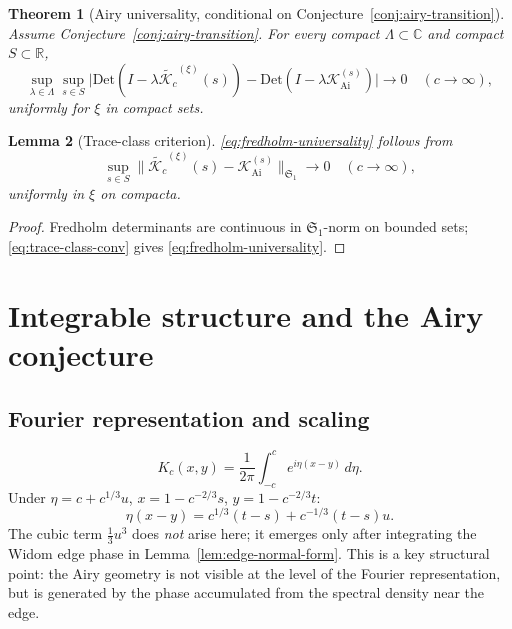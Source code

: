\documentclass[12pt,a4paper]{amsart}
\newtheorem{theorem}{Theorem}[section]
\newtheorem{lemma}[theorem]{Lemma}
\theoremstyle{definition}
\theoremstyle{remark}
\newcommand{\norm}[1]{\|#1\|}
\newcommand{\Kc}{\mathcal{K}_c}
\newcommand{\Kairy}{\mathcal{K}_{\mathrm{Ai}}}
\newcommand{\R}{\mathbb{R}}
\newcommand{\Det}{\mathrm{Det}}
\begin{document}
\begin{theorem}[Airy universality, conditional on
  Conjecture~\ref{conj:airy-transition}]
\label{thm:universality}
Assume Conjecture~\ref{conj:airy-transition}.
For every compact $\Lambda\subset\mathbb{C}$ and compact $S\subset\R$,
\begin{equation}\label{eq:fredholm-universality}
  \sup_{\lambda\in\Lambda}\sup_{s\in S}
  \bigl|\Det(I-\lambda\widetilde{\Kc}^{(\xi)}(s))
       -\Det(I-\lambda\Kairy^{(s)})\bigr|
  \longrightarrow 0\quad(c\to\infty),
\end{equation}
uniformly for $\xi$ in compact sets.
\end{theorem}

\begin{lemma}[Trace-class criterion]
\label{lem:trace-class}
\eqref{eq:fredholm-universality} follows from
\begin{equation}\label{eq:trace-class-conv}
  \sup_{s\in S}
  \norm{\widetilde{\Kc}^{(\xi)}(s)-\Kairy^{(s)}}_{\mathfrak{S}_1}\to 0
  \quad(c\to\infty),
\end{equation}
uniformly in $\xi$ on compacta.
\end{lemma}

\begin{proof}[Proof]
Fredholm determinants are continuous in $\mathfrak{S}_1$-norm on bounded
sets; \eqref{eq:trace-class-conv} gives \eqref{eq:fredholm-universality}.
\end{proof}

\section{Integrable structure and the Airy conjecture}
\label{sec:kernel-programme}

\subsection{Fourier representation and scaling}

\begin{equation}\label{eq:sinc-fourier}
  K_c(x,y)=\frac{1}{2\pi}\int_{-c}^{c}e^{i\eta(x-y)}\,d\eta.
\end{equation}
Under $\eta=c+c^{1/3}u$, $x=1-c^{-2/3}s$, $y=1-c^{-2/3}t$:
\begin{equation}\label{eq:linear-phase}
  \eta(x-y)=c^{1/3}(t-s)+c^{-1/3}(t-s)u.
\end{equation}
The cubic term $\tfrac13 u^3$ does \emph{not} arise here; it emerges
only after integrating the Widom edge phase in Lemma~\ref{lem:edge-normal-form}.
This is a key structural point: the Airy geometry is not visible at the
level of the Fourier representation, but is generated by the phase
accumulated from the spectral density near the edge.
\end{document}
